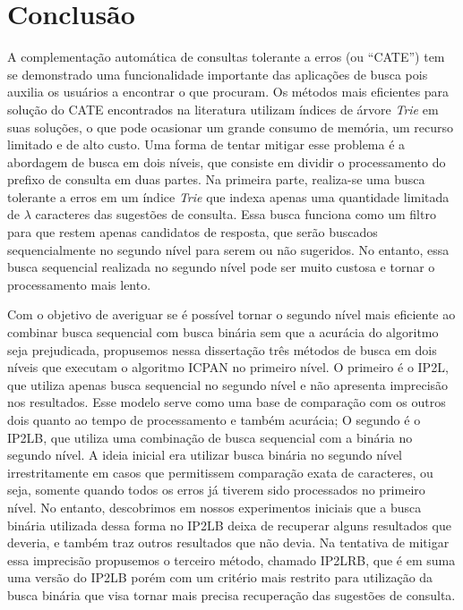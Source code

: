 \chapter{Conclusão}
\label{sec:conclusion}

A complementação automática de consultas tolerante a erros (ou ``CATE'') tem se demonstrado uma funcionalidade importante das aplicações de busca pois auxilia os usuários a encontrar o que procuram. Os métodos mais eficientes para solução do CATE encontrados na literatura utilizam índices de árvore \textit{Trie} em suas soluções, o que pode ocasionar um grande consumo de memória, um recurso limitado e de alto custo. Uma forma de tentar mitigar esse problema é a abordagem de busca em dois níveis, que consiste em dividir o processamento do prefixo de consulta em duas partes. Na primeira parte, realiza-se uma busca tolerante a erros em um índice \textit{Trie} que indexa apenas uma quantidade limitada de $\lambda$ caracteres das sugestões de consulta. Essa busca funciona como um filtro para que restem apenas candidatos de resposta, que serão buscados sequencialmente no segundo nível para serem ou não sugeridos. No entanto, essa busca sequencial realizada no segundo nível pode ser muito custosa e tornar o processamento mais lento. 

Com o objetivo de averiguar se é possível tornar o segundo nível mais eficiente ao combinar busca sequencial com busca binária sem que a acurácia do algoritmo seja prejudicada, propusemos nessa dissertação três métodos de busca em dois níveis que executam o algoritmo  ICPAN no primeiro nível. O primeiro é o IP2L, que utiliza apenas busca sequencial no segundo nível e não apresenta imprecisão nos resultados. Esse modelo serve como uma base de comparação com os outros dois quanto ao tempo de processamento e também acurácia; O segundo é o IP2LB, que utiliza uma combinação de busca sequencial com a binária no segundo nível. A ideia inicial era utilizar busca binária no segundo nível irrestritamente em casos que permitissem comparação exata de caracteres, ou seja, somente quando todos os erros já tiverem sido processados no primeiro nível. No entanto, descobrimos em nossos experimentos iniciais que a busca binária utilizada dessa forma no IP2LB deixa de recuperar alguns resultados que deveria, e também traz outros resultados que não devia. Na tentativa de mitigar essa imprecisão propusemos o terceiro método, chamado IP2LRB, que é em suma uma versão do IP2LB porém com um critério mais restrito para utilização da busca binária que visa tornar mais precisa recuperação das sugestões de consulta.


